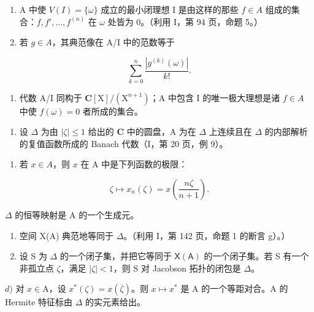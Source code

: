 \begin{enumerate}
\def\labelenumi{\alph{enumi})}
\item
  A 中使 \(V(I) = \{\omega\}\) 成立的最小闭理想 I 是由这样的那些 \(f \in A\) 组成的集合：\(f, f', \ldots, f^{(n)}\) 在 \(\omega\) 处皆为 0。（利用 I，第 94 页，命题 5。）
\item
  若 \(g \in A\)，其典范像在 A/I 中的范数等于
\end{enumerate}

\[
\sum_ {k = 0} ^ {n} \frac {| g ^ {(k)} (\omega) |}{k !}.
\]

\begin{enumerate}
\def\labelenumi{\alph{enumi})}
\setcounter{enumi}{2}
\tightlist
\item
  代数 A/I 同构于 \(\mathbf{C}[\mathrm{X}]/(\mathrm{X}^{n+1})\)；A 中包含 I 的唯一极大理想是诸 \(f \in A\) 中使 \(f(\omega) = 0\) 者所成的集合。
\end{enumerate}

\begin{enumerate}
\def\labelenumi{\arabic{enumi})}
\setcounter{enumi}{5}
\tightlist
\item
  设 \(\Delta\) 为由 \(|\zeta| \leqslant 1\) 给出的 \(\mathbf{C}\) 中的圆盘，A 为在 \(\Delta\) 上连续且在 \(\Delta\) 的内部解析的复值函数所成的 Banach 代数（I，第 20 页，例 9）。
\end{enumerate}

\begin{enumerate}
\def\labelenumi{\alph{enumi})}
\tightlist
\item
  若 \(x \in A\)，则 \(x\) 在 A 中是下列函数的极限：
\end{enumerate}

\[
\zeta \mapsto x _ {n} (\zeta) = x \left(\frac {n \zeta}{n + 1}\right).
\]

\(\Delta\) 的恒等映射是 A 的一个生成元。

\begin{enumerate}
\def\labelenumi{\alph{enumi})}
\setcounter{enumi}{1}
\item
  空间 X(A) 典范地等同于 \(\Delta\)。（利用 I，第 142 页，命题 1 的断言 g）。）
\item
  设 S 为 \(\Delta\) 的一个闭子集，并把它等同于 \(\mathsf{X}(\mathsf{A})\) 的一个闭子集。若 S 有一个非孤立点 \(\zeta\)，满足 \(|\zeta| < 1\)，则 S 对 Jacobson 拓扑的闭包是 \(\Delta\)。
\end{enumerate}

\(d)\) 对 \(x \in \mathrm{A}\)，设 \(x^{*}(\zeta) = x(\overline{\zeta})\)。则 \(x \mapsto x^{*}\) 是 A 的一个等距对合。A 的 Hermite 特征标由 \(\Delta\) 的实元素给出。

